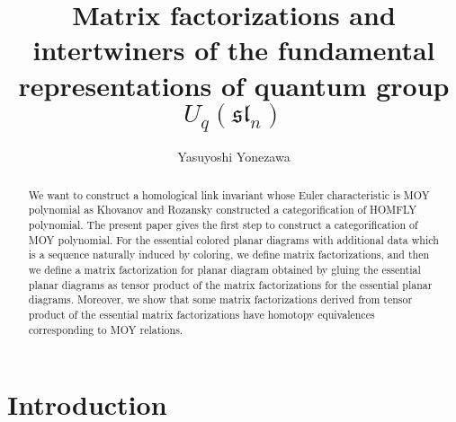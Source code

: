 \documentclass[10pt]{amsart}
\title[Matrix factorizations and $U_q (\mathfrak{sl}_n)$ intertwiners]{Matrix factorizations and intertwiners of the fundamental representations of quantum group $U_q (\mathfrak{sl}_n)$}
\author{Yasuyoshi Yonezawa}
\date{}
\theoremstyle{break}
\begin{document}
\maketitle
\begin{abstract}
We want to construct a homological link invariant whose Euler characteristic is MOY polynomial as Khovanov and Rozansky constructed a categorification of HOMFLY polynomial. The present paper gives the first step to construct a categorification of MOY polynomial. For the essential colored planar diagrams with additional data which is a sequence naturally induced by coloring, we define matrix factorizations, and then we define a matrix factorization for planar diagram obtained by gluing the essential planar diagrams as tensor product of the matrix factorizations for the essential planar diagrams. Moreover, we show that some matrix factorizations derived from tensor product of the essential matrix factorizations have homotopy equivalences corresponding to MOY relations.
\end{abstract}
\tableofcontents

\section{Introduction}
\end{document}
